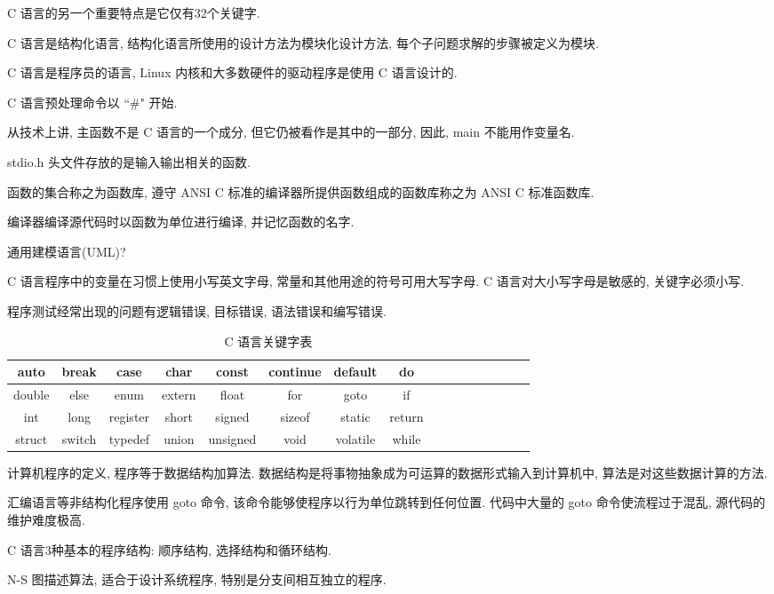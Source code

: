 C 语言的另一个重要特点是它仅有32个关键字.

C 语言是结构化语言, 结构化语言所使用的设计方法为模块化设计方法, 每个子问题求解的步骤被定义为模块.

C 语言是程序员的语言, Linux 内核和大多数硬件的驱动程序是使用 C 语言设计的.

C 语言预处理命令以 ``\#" 开始.

从技术上讲, 主函数不是 C 语言的一个成分, 但它仍被看作是其中的一部分, 因此, main 不能用作变量名.

stdio.h 头文件存放的是输入输出相关的函数.

函数的集合称之为函数库, 遵守 ANSI C 标准的编译器所提供函数组成的函数库称之为 ANSI C 标准函数库.

编译器编译源代码时以函数为单位进行编译, 并记忆函数的名字.

通用建模语言(UML)?

C 语言程序中的变量在习惯上使用小写英文字母, 常量和其他用途的符号可用大写字母.
C 语言对大小写字母是敏感的, 关键字必须小写.

程序测试经常出现的问题有逻辑错误, 目标错误, 语法错误和编写错误.

\begin{table}[H]
\small %
\sffamily %
\centering %
\renewcommand{\arraystretch}{1.4} %
\caption{C 语言关键字表}
\begin{tabular}{*{2}{c|c|c|c|c|c|c|c}}
 \hline
 auto & break & case & char & const & continue & default & do\\ \hline
 double & else & enum & extern & float & for & goto & if\\ \hline
 int & long & register & short & signed & sizeof & static & return\\ \hline
 struct & switch & typedef & union & unsigned & void & volatile & while\\ \hline
\end{tabular}
\end{table}

计算机程序的定义, 程序等于数据结构加算法. 数据结构是将事物抽象成为可运算的数据形式输入到计算机中,
算法是对这些数据计算的方法.

汇编语言等非结构化程序使用 goto 命令, 该命令能够使程序以行为单位跳转到任何位置. 代码中大量的 goto
命令使流程过于混乱, 源代码的维护难度极高.

C 语言3种基本的程序结构: 顺序结构, 选择结构和循环结构.

N-S 图描述算法, 适合于设计系统程序, 特别是分支间相互独立的程序.


